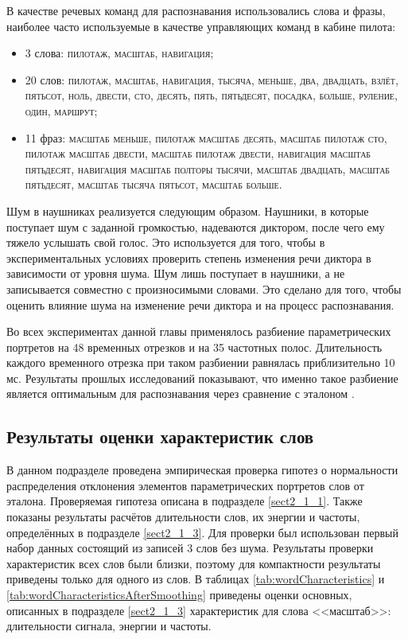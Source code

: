 В качестве речевых команд для распознавания использовались слова и фразы, наиболее часто используемые в качестве управляющих команд в кабине пилота:
\begin{itemize}
	\item 3 слова: \textsc{пилотаж, масштаб, навигация};
	\item 20 слов: \textsc{пилотаж, масштаб, навигация, тысяча, меньше, два, двадцать, взлёт, пятьсот, ноль, двести, сто, десять, пять, пятьдесят, посадка, больше, руление, один, маршрут};
	\item 11 фраз: \textsc{масштаб меньше, пилотаж масштаб десять, масштаб пилотаж сто, пилотаж масштаб двести, масштаб пилотаж двести, навигация масштаб пятьдесят, навигация масштаб полторы тысячи, масштаб двадцать, масштаб пятьдесят, масштаб тысяча пятьсот, масштаб больше}.
\end{itemize}

Шум в наушниках реализуется следующим образом.
Наушники, в которые поступает шум с заданной громкостью, надеваются диктором, после чего ему тяжело услышать свой голос.
Это используется для того, чтобы в экспериментальных условиях проверить степень изменения речи диктора в зависимости от уровня шума.
Шум лишь поступает в наушники, а не записывается совместно с произносимыми словами.
Это сделано для того, чтобы оценить влияние шума на изменение речи диктора и на процесс распознавания.

Во всех экспериментах данной главы применялось разбиение параметрических портретов на 48 временных отрезков и на 35 частотных полос.
Длительность каждого временного отрезка при таком разбиении равнялась приблизительно 10 мс.
Результаты прошлых исследований показывают, что именно такое разбиение является оптимальным для распознавания через сравнение с эталоном \cite{ilnara2014optimization}.


\subsection{Результаты оценки характеристик слов} \label{sect3_1_2}

В данном подразделе проведена эмпирическая проверка гипотез о нормальности распределения отклонения элементов параметрических портретов слов от эталона.
Проверяемая гипотеза описана в подразделе \ref{sect2_1_1}.
Также показаны результаты расчётов длительности слов, их энергии и частоты, определённых в подразделе \ref{sect2_1_3}.
Для проверки был использован первый набор данных состоящий из записей 3 слов без шума.
Результаты проверки характеристик всех слов были близки, поэтому для компактности результаты приведены только для одного из слов.
В таблицах \ref{tab:wordCharacteristics} и \ref{tab:wordCharacteristicsAfterSmoothing} приведены оценки основных, описанных в подразделе \ref{sect2_1_3} характеристик для слова <<масштаб>>: длительности сигнала, энергии и частоты.

